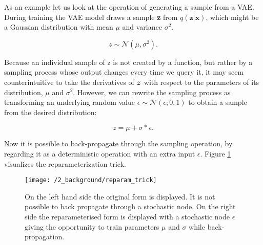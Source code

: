 As an example let us look at the operation of generating a sample from a VAE.
During training the VAE model draws a sample \textbf{z} from
$q(\textbf{z}|\textbf{x})$, which might be a Gaussian distribution with mean
$\mu$ and variance $\sigma^2$.

\begin{equation}
    z \sim \mathcal{N}(\mu, \sigma^2).
\end{equation}

Because an individual sample of z is not created by a function, but rather by a
sampling process whose output changes every time we query it, it may seem
counterintuitive to take the derivatives of $\boldsymbol{z}$ with respect to the parameters of
its distribution, $\mu$ and $\sigma^2$. However, we can rewrite the sampling
process as transforming an underlying random value $\epsilon \sim
\mathcal{N}(\epsilon; 0, 1)$ to obtain a sample from the desired distribution:

\begin{equation}
    z = \mu + \sigma * \epsilon.
\end{equation}

Now it is possible to back-propagate through the sampling operation, by
regarding it as a deterministic operation with an extra input $\epsilon$.
Figure \ref{reparam_trick} visualizes the reparameterization trick.

\begin{figure}
	\centering
	\texttt{[image: /2\_background/reparam\_trick]}
    \caption{On the left hand side the original form is displayed. It is not
    possible to back propagate through a stochastic node. On the right side the
    reparameterised form is displayed with a stochastic node $\epsilon$ giving
    the opportunity to train parameters $\mu$ and $\sigma$ while
    back-propagation.} 
	\label{reparam_trick}
\end{figure}

